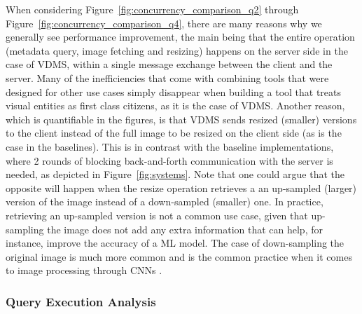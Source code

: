 When considering Figure~\ref{fig:concurrency_comparison_q2}
through Figure~\ref{fig:concurrency_comparison_q4},
there are many reasons why we generally see performance improvement, the main being
that the entire operation (metadata query, image fetching and resizing) happens
on the server side in the case of VDMS, within a single message
exchange between the client and the server.
Many of the inefficiencies that come with combining tools that were designed
for other use cases simply disappear when building a tool that treats
visual entities as first class citizens, as it is the case of VDMS.
Another reason, which is quantifiable in the figures, is that
VDMS sends resized (smaller) versions to the client instead of the full image
to be resized on the client side (as is the case in the baselines).
This is in contrast with the baseline implementations,
where 2 rounds of blocking back-and-forth communication with the server is needed,
as depicted in Figure~\ref{fig:systems}.
Note that one could argue that the opposite will happen
when the resize operation retrieves a an up-sampled (larger) version of the image
instead of a down-sampled (smaller) one.
In practice, retrieving an up-sampled version is not a common use case,
given that up-sampling the image does not add any extra information that can help,
for instance, improve the accuracy of a ML model.
The case of down-sampling the original image is much more common and is the common
practice when it comes to image processing through CNNs \cite{cnn,resnet}.




\subsubsection{Query Execution Analysis}

